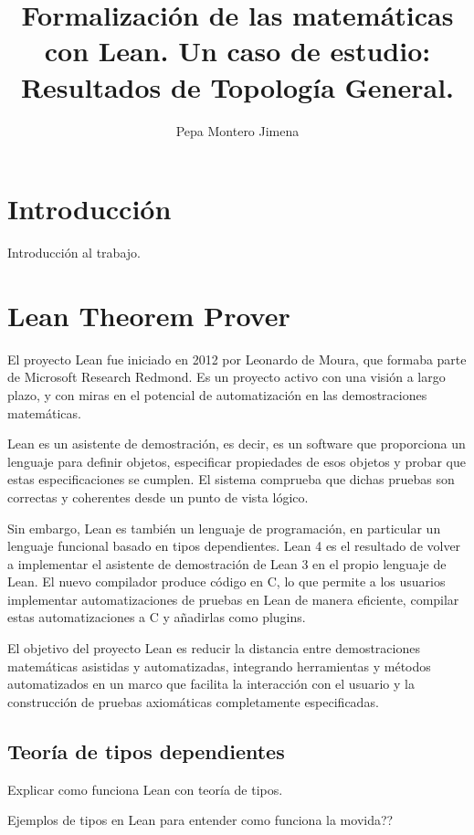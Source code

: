 \documentclass{article}
\title{Formalización de las matemáticas con Lean. Un caso de estudio: Resultados de Topología General.}
\author{Pepa Montero Jimena}
\date{}
\begin{document}
\maketitle

\section{Introducción}

Introducción al trabajo.

\section{Lean Theorem Prover}

El proyecto Lean fue iniciado en 2012 por Leonardo de Moura, que formaba parte de Microsoft Research Redmond. Es un proyecto activo con una visión a largo plazo, y con miras en el potencial de automatización en las demostraciones matemáticas.\cite{avigad2015theorem}

Lean es un asistente de demostración, es decir, es un software que proporciona un lenguaje para definir objetos, especificar propiedades de esos objetos y probar que estas especificaciones se cumplen. El sistema comprueba que dichas pruebas son correctas y coherentes desde un punto de vista lógico. \cite{leanprover2024} 

Sin embargo, Lean es también un lenguaje de programación, en particular un lenguaje funcional basado en tipos dependientes. Lean 4 es el resultado de volver a implementar el asistente de demostración de Lean 3 en el propio lenguaje de Lean. El nuevo compilador produce código en C, lo que permite a los usuarios implementar automatizaciones de pruebas en Lean de manera eficiente, compilar estas automatizaciones a C y añadirlas como plugins\cite{moura2021lean}.

El objetivo del proyecto Lean es reducir la distancia entre demostraciones matemáticas asistidas y automatizadas, integrando herramientas y métodos automatizados en un marco que facilita la interacción con el usuario y la construcción de pruebas axiomáticas completamente especificadas\cite{avigad2015theorem}.

\subsection{Teoría de tipos dependientes}


Explicar como funciona Lean con teoría de tipos.

Ejemplos de tipos en Lean para entender como funciona la movida??
\end{document}
